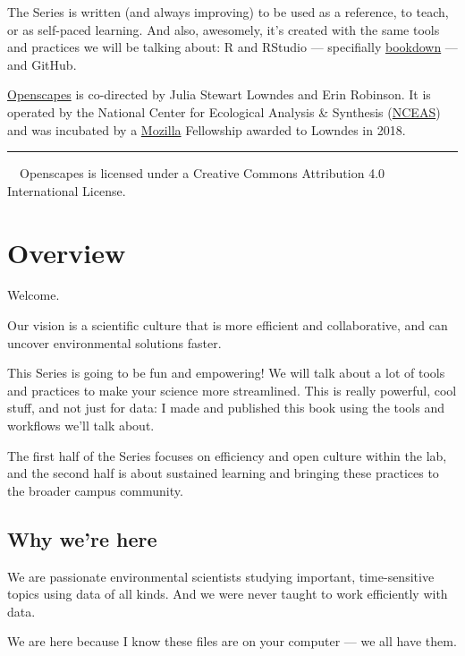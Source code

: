 \documentclass[
  letterpaper,
  DIV=11,
  numbers=noendperiod]{scrreprt}
\begin{document}
The Series is written (and always improving) to be used as a reference,
to teach, or as self-paced learning. And also, awesomely, it's created
with the same tools and practices we will be talking about: R and
RStudio --- specifially
\href{https://bookdown.org/yihui/bookdown/}{bookdown} --- and GitHub.

\href{https://openscapes.org}{Openscapes} is co-directed by Julia
Stewart Lowndes and Erin Robinson. It is operated by the National Center
for Ecological Analysis \& Synthesis
(\href{https://www.nceas.ucsb.edu/}{NCEAS}) and was incubated by a
\href{https://foundation.mozilla.org/en/}{Mozilla} Fellowship awarded to
Lowndes in 2018.

\begin{center}\rule{0.5\linewidth}{0.5pt}\end{center}

~~Openscapes is licensed under a Creative Commons Attribution 4.0
International License.

\hypertarget{overview}{%
\chapter{Overview}\label{overview}}

Welcome.

Our vision is a scientific culture that is more efficient and
collaborative, and can uncover environmental solutions faster.

This Series is going to be fun and empowering! We will talk about a lot
of tools and practices to make your science more streamlined. This is
really powerful, cool stuff, and not just for data: I made and published
this book using the tools and workflows we'll talk about.

The first half of the Series focuses on efficiency and open culture
within the lab, and the second half is about sustained learning and
bringing these practices to the broader campus community.

\hypertarget{why-were-here}{%
\section{Why we're here}\label{why-were-here}}

We are passionate environmental scientists studying important,
time-sensitive topics using data of all kinds. And we were never taught
to work efficiently with data.

We are here because I know these files are on your computer --- we all
have them.
\end{document}
